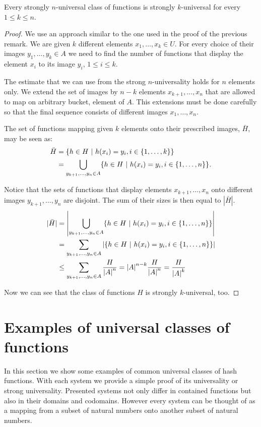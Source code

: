 \begin{remark}
Every strongly $n$-universal class of functions is strongly $k$-universal for every $1 \leq k \leq n$.
\end{remark}
\begin{proof}
We use an approach similar to the one used in the proof of the previous remark. We are given $k$ different elements $x_1, \dots, x_k \in U$. For every choice of their images $y_1, \dots, y_k \in A$ we need to find the number of functions that display the element $x_i$ to its image $y_i$, $1 \leq i \leq k$. 

The estimate that we can use from the strong $n$-universality holds for $n$ elements only. We extend the set of images by $n - k$ elements $x_{k + 1}, \dots, x_n$ that are allowed to map on arbitrary bucket, element of $A$. This extensions must be done carefully so that the final sequence consists of different images $x_1, \dots, x_n$.

The set of functions mapping given $k$ elements onto their prescribed images, $\bar H$,  may be seen as:
\[
\begin{split}
\bar{H}	& = \lbrace h \in H \ | \  h(x_i) = y_i, i \in \lbrace 1, \dots, k \rbrace \rbrace \\
	& = \displaystyle \bigcup_{y_{k+1}, \dots, y_n \in A} \lbrace h \in H \ | \  h(x_i) = y_i, i \in \lbrace 1, \dots, n \rbrace \rbrace \textit{.}
\end{split}
\]

Notice that the sets of functions that display elements $x_{k + 1}, \dots, x_n$ onto different images $y_{k + 1}, \dots, y_n$ are disjoint. The sum of their sizes is then equal to $|\bar H|$.
\[
\begin{split}
|\bar H|& = \left| \displaystyle \bigcup_{y_{k+1}, \dots, y_n \in A} \lbrace h \in H \ | \  h(x_i) = y_i, i \in \lbrace 1, \dots, n \rbrace \rbrace \right| \\
	& = \displaystyle \sum_{y_{k+1}, \dots, y_n \in A} \left| \lbrace h \in H \ | \  h(x_i) = y_i, i \in \lbrace 1, \dots, n \rbrace \rbrace \right| \\
	& \leq \displaystyle \sum_{y_{k+1}, \dots, y_n \in A} \frac{H}{{|A|}^{n}} = {|A|}^{n - k} \frac{H}{{|A|}^{n}} = \frac{H}{{|A|}^{k}}
\end{split}
\]

Now we can see that the class of functions $H$ is strongly $k$-universal, too.
\end{proof}

\section{Examples of universal classes of functions}
In this section we show some examples of common universal classes of hash functions. With each system we provide a simple proof of its universality or strong universality. Presented systems not only differ in contained functions but also in their domains and codomains. However every system can be thought of as a mapping from a subset of natural numbers onto another subset of natural numbers.

